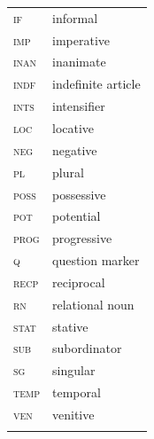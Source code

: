 \documentclass[output=paper,colorlinks=true, citecolor=brown]{langscibook}
\begin{document}
\begin{tabularx}{.45\textwidth}{lQ}
{\scshape if} & informal\\
{\scshape imp} & imperative\\
{\scshape inan} & inanimate\\
\scshape indf & indefinite article\\
{\scshape ints} & intensifier\\{\scshape loc} & locative\\
{\scshape neg} & negative\\
{\scshape pl} & plural\\
{\scshape poss} & possessive\\
{\scshape pot} & potential\\
{\scshape prog} & progressive\\
{\scshape q} & question marker\\
{\scshape recp} & reciprocal\\
{\scshape rn} & relational noun\\
{\scshape stat} & stative\\
{\scshape sub} & subordinator\\
{\scshape sg} & singular\\
{\scshape temp} & temporal \\
{\scshape ven} & venitive\\
\\
\end{tabularx}


\sloppy\printbibliography[heading=subbibliography,notkeyword=this]
\end{document}
